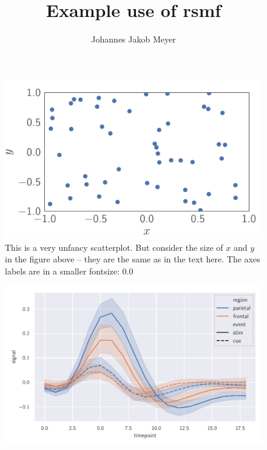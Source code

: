 \documentclass[a4paper,12pt]{quantumarticle}
\title{Example use of rsmf}
\author{Johannes Jakob Meyer}
\begin{document}
\maketitle

\lipsum[1-3]

\begin{figure}
	\centering
	\includegraphics{scatter}
	\caption{This is a very unfancy scatterplot. But consider the size of $x$ and $y$ in the figure above -- they are the same as in the text here. The axes labels are in a smaller fontsize: {\footnotesize 0.0}}
\end{figure}

\lipsum[11-16]

\begin{figure}
	\centering
	\includegraphics{fmri}
	\caption{\lipsum[1-2]}
\end{figure}

\lipsum[21-26]
\end{document}
